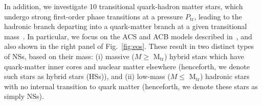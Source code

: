 \documentclass[prd,twocolumn,nofootinbib,superscriptaddress,amsmath,amssymb]{revtex4-1}
\begin{document}

In addition, we investigate 10 transitional quark-hadron matter stars, which undergo strong first-order phase transitions at a pressure $P_{\text{tr}}$, leading to the hadronic branch departing into a quark-matter branch at a given transitional mass~\cite{Paschalidis2018,Alford:2017qgh,1971SvA....15..347S,Zdunik:2012dj,Alford:2013aca}. In particular, we focus on the ACS and ACB models described in~\cite{Paschalidis2018}, and also shown in the right panel of Fig.~\ref{fig:eos}. These result in two distinct types of NSs, based on their mass: (i) massive ($M \geq \text{ M}_{\text{tr}}$) hybrid stars which have quark-matter inner cores and nuclear matter elsewhere (henceforth, we denote such stars as hybrid stars (HSs)), and (ii) low-mass ($M \leq \text{ M}_{\text{tr}}$) hadronic stars with no internal transition to quark matter (henceforth, we denote these stars as simply NSs).
\end{document}
